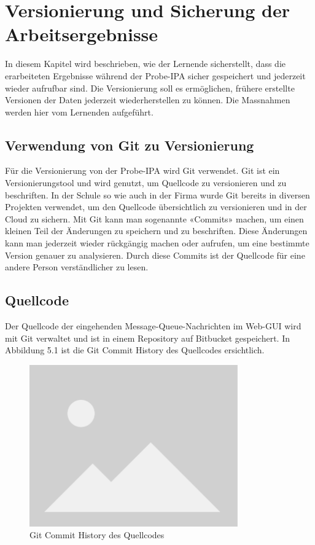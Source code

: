 \chapter{Versionierung und Sicherung der Arbeitsergebnisse}\label{ch:versionierung-und-sicherung-der-arbeitsergebnisse}
In diesem Kapitel wird beschrieben, wie der Lernende sicherstellt, dass die erarbeiteten Ergebnisse während der Probe-IPA sicher gespeichert und jederzeit wieder aufrufbar sind. Die Versionierung soll es ermöglichen, frühere erstellte Versionen der Daten jederzeit wiederherstellen zu können. Die Massnahmen werden hier vom Lernenden aufgeführt.

\section{Verwendung von Git zu Versionierung}
Für die Versionierung von der Probe-IPA wird Git verwendet. Git ist ein Versionierungstool und wird genutzt, um Quellcode zu versionieren und zu beschriften. In der Schule so wie auch in der Firma wurde Git bereits in diversen Projekten verwendet, um den Quellcode übersichtlich zu versionieren und in der Cloud zu sichern. Mit Git kann man sogenannte «Commits» machen, um einen kleinen Teil der Änderungen zu speichern und zu beschriften. Diese Änderungen kann man jederzeit wieder rückgängig machen oder aufrufen, um eine bestimmte Version genauer zu analysieren. Durch diese Commits ist der Quellcode für eine andere Person verständlicher zu lesen.

\section{Quellcode}
Der Quellcode der eingehenden Message-Queue-Nachrichten im Web-GUI wird mit Git verwaltet und ist in einem Repository auf Bitbucket gespeichert. In Abbildung 5.1 ist die Git Commit History des Quellcodes ersichtlich.

\begin{figure}[H]
	\begin{center}
		\includegraphics[width=0.8\textwidth]{ressourcen/placeholder}
		\caption[Git Commit History des Quellcodes]{Git Commit History des Quellcodes}\label{fig:Git-Commit-History-des-Quellcodes}
	\end{center}
\end{figure}

